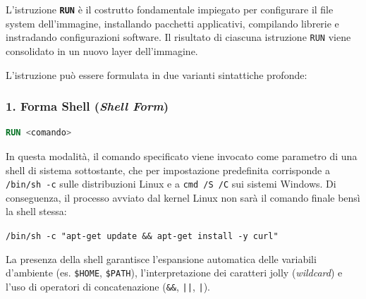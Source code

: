 \documentclass[11pt, a4paper]{article}
\begin{document}
L'istruzione \textbf{\texttt{RUN}} è il costrutto fondamentale impiegato per configurare il file system dell'immagine, installando pacchetti applicativi, compilando librerie e instradando configurazioni software. Il risultato di ciascuna istruzione \texttt{RUN} viene consolidato in un nuovo layer dell'immagine.

L'istruzione può essere formulata in due varianti sintattiche profonde:

\subsubsection{1. Forma Shell (\emph{Shell Form})}
\begin{lstlisting}[language=dockerfile]
RUN <comando>
\end{lstlisting}
In questa modalità, il comando specificato viene invocato come parametro di una shell di sistema sottostante, che per impostazione predefinita corrisponde a \texttt{/bin/sh -c} sulle distribuzioni Linux e a \texttt{cmd /S /C} sui sistemi Windows. Di conseguenza, il processo avviato dal kernel Linux non sarà il comando finale bensì la shell stessa:
\begin{center}
    \texttt{/bin/sh -c "apt-get update \&\& apt-get install -y curl"}
\end{center}
La presenza della shell garantisce l'espansione automatica delle variabili d'ambiente (es. \texttt{\$HOME}, \texttt{\$PATH}), l'interpretazione dei caratteri jolly (\emph{wildcard}) e l'uso di operatori di concatenazione (\texttt{\&\&}, \texttt{||}, \texttt{|}).
\end{document}
